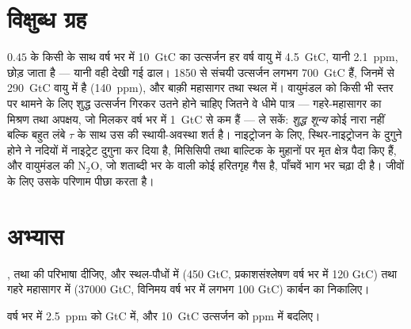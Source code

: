 \section{विक्षुब्ध ग्रह}

\begin{example}[वे अंक क्या कहते हैं]\label{ex:b2:biogeochemical-cycles:numbers}
$0.45$ के किसी  के साथ वर्ष भर में \qty{10}{GtC} का उत्सर्जन
हर वर्ष वायु में \qty{4.5}{GtC}, यानी \qty{2.1}{ppm}, छोड़ जाता है
--- यानी वही देखी गई ढाल। 1850 से संचयी उत्सर्जन लगभग
\qty{700}{GtC} हैं, जिनमें से \qty{290}{GtC} वायु में है (140~ppm), और
बाक़ी महासागर तथा स्थल में। वायुमंडल को किसी भी स्तर पर थामने के लिए शुद्ध
उत्सर्जन गिरकर उतने होने चाहिए जितने वे धीमे पात्र --- गहरे-महासागर का मिश्रण तथा
अपक्षय, जो मिलकर वर्ष भर में \qty{1}{GtC} से कम हैं --- ले सकें:
\emph{शुद्ध शून्य} कोई नारा नहीं बल्कि बहुत लंबे $\tau$ के साथ उस  की
स्थायी-अवस्था शर्त है। नाइट्रोजन के लिए,
स्थिर-नाइट्रोजन  के दुगुने होने ने नदियों में नाइट्रेट दुगुना कर दिया है,
मिसिसिपी तथा बाल्टिक के मुहानों पर मृत क्षेत्र पैदा किए हैं, और
वायुमंडल की $\mathrm{N_2O}$, जो शताब्दी भर के  वाली कोई
हरितगृह गैस है, पाँचवें भाग भर चढ़ा दी है। 
जीवों के लिए उसके परिणाम पीछा करता है।
\end{example}

\section{अभ्यास}

\begin{exercise}[$\star$]\label{exo:b2:biogeochemical-cycles:1}
,  तथा  की परिभाषा दीजिए, और
स्थल-पौधों में (450 GtC, प्रकाशसंश्लेषण वर्ष भर में
120 GtC) तथा गहरे महासागर में (\num{37000} GtC, विनिमय
वर्ष भर में लगभग 100 GtC) कार्बन का  निकालिए।
\end{exercise}

\begin{exercise}[$\star$]\label{exo:b2:biogeochemical-cycles:2}
वर्ष भर में \qty{2.5}{ppm} को GtC में, और \qty{10}{GtC} उत्सर्जन को
ppm में बदलिए।
\end{exercise}

